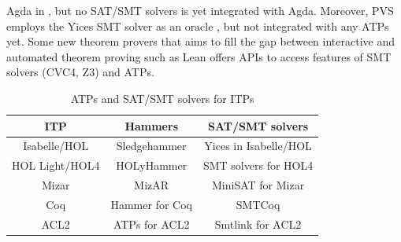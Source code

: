 Agda in , but no SAT/SMT solvers is yet integrated with Agda. Moreover, PVS employs the Yices SMT solver as an oracle , 
but not integrated with any ATPs yet.
Some new theorem provers that aims to fill the gap between interactive and automated theorem proving such as Lean  
 offers APIs to access features of SMT solvers (CVC4, Z3) and ATPs.
\begin{table}[!ht]
 \centering
  \caption{ATPs and SAT/SMT solvers for ITPs}\label{diff7}
 \begin{tabular}{|c|c|c|}
    \hline
    {\bf ITP} & {\bf Hammers} & {\bf SAT/SMT solvers} \\ \hline
     Isabelle/HOL & Sledgehammer  & Yices in Isabelle/HOL  \\ \hline
     HOL Light/HOL4 & HOLyHammer  & SMT solvers for HOL4  \\ \hline
     Mizar & MizAR  & MiniSAT for Mizar  \\ \hline
     Coq & Hammer for Coq  & SMTCoq \\\hline
     ACL2 & ATPs for ACL2  & Smtlink for ACL2 \\\hline
     \end{tabular}
\end{table}\vspace*{-2mm}


